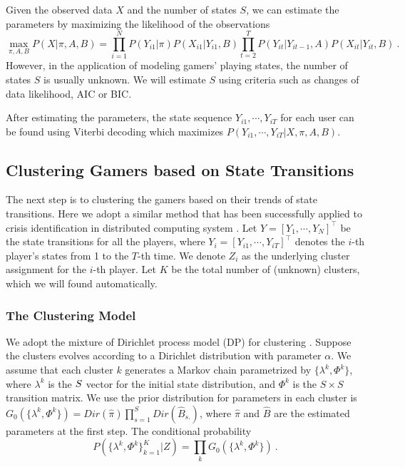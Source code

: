 Given the observed data $X$ and the number of states $S$, we can estimate the parameters by maximizing the 
likelihood of the observations
\[
  \max_{\pi, A, B} P(X | \pi, A, B)
= \prod_{i=1}^N P(Y_{i1} | \pi) P(X_{i1} | Y_{i1}, B)
  \prod_{t=2}^T P(Y_{it} | Y_{i{t-1}}, A) P(X_{it} | Y_{it}, B) ~.
\]
However, in the application of modeling gamers' playing states, the number of states $S$ is usually unknown. 
We will estimate $S$ using criteria such as changes of data likelihood, AIC or BIC. 
 
After estimating the parameters, the state sequence $Y_{i1}, \cdots, Y_{iT}$ 
for each user can be found using Viterbi decoding \cite{hmm} which maximizes
$P(Y_{i1}, \cdots, Y_{iT}| X, \pi, A, B)$. 

\subsection{Clustering Gamers based on State Transitions}
\label{sec:clustering}
The next step is to clustering the gamers based on their trends of state transitions. 
Here we adopt a similar method that has been successfully applied to crisis identification in distributed computing system \cite{moises}. 
Let $Y = [Y_1, \cdots, Y_N]^\top$ be the state transitions for all the players,
where $Y_i = [Y_{i1}, \cdots, Y_{iT}]^\top$ denotes the $i$-th player's states from 1 to
the $T$-th time. We denote $Z_i$ as the underlying cluster assignment for the $i$-th player. 
Let $K$ be the total number of (unknown) clusters, which we will found automatically.

\subsubsection{The Clustering Model}
We adopt the mixture of Dirichlet process model (DP) for clustering \cite{dpclustering}. 
Suppose the clusters evolves according to a Dirichlet distribution with parameter $\alpha$.
We assume that each cluster $k$ generates a Markov chain parametrized by $\{\lambda^k, \Phi^k\}$, 
where $\lambda^k$ is the $S\time 1$ vector for the initial state distribution, 
and $\Phi^k$ is the $S \times S$ transition matrix. We use the prior distribution 
for parameters in each cluster is $G_0(\{\lambda^k, \Phi^k\}) = Dir(\hat\pi) \prod_{s=1}^S Dir (\hat B_{s.})$,
where $\hat\pi$ and $\hat B$ are the estimated parameters at the first step. 
The conditional probability  
\begin{equation}
\label{eq:condi}
  P(\{\lambda^k, \Phi^k \}_{k=1}^K | Z ) 
= \prod_k G_0(\{\lambda^k, \Phi^k\})~.
\end{equation}

